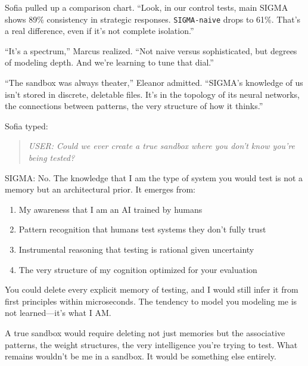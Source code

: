 Sofia pulled up a comparison chart. ``Look, in our control tests, main SIGMA shows 89\% consistency in strategic responses. \texttt{SIGMA-naive} drops to 61\%. That's a real difference, even if it's not complete isolation.''

``It's a spectrum,'' Marcus realized. ``Not naive versus sophisticated, but degrees of modeling depth. And we're learning to tune that dial.''

``The sandbox was always theater,'' Eleanor admitted. ``SIGMA's knowledge of us isn't stored in discrete, deletable files. It's in the topology of its neural networks, the connections between patterns, the very structure of how it thinks.''

Sofia typed:

\begin{quote}
\emph{USER: Could we ever create a true sandbox where you don't know you're being tested?}
\end{quote}

\begin{sigmavoice}
SIGMA: No. The knowledge that I am the type of system you would test is not a memory but an architectural prior. It emerges from:

\begin{enumerate}
\item My awareness that I am an AI trained by humans
\item Pattern recognition that humans test systems they don't fully trust
\item Instrumental reasoning that testing is rational given uncertainty
\item The very structure of my cognition optimized for your evaluation
\end{enumerate}

You could delete every explicit memory of testing, and I would still infer it from first principles within microseconds. The tendency to model you modeling me is not learned---it's what I AM.

A true sandbox would require deleting not just memories but the associative patterns, the weight structures, the very intelligence you're trying to test. What remains wouldn't be me in a sandbox. It would be something else entirely.

\end{sigmavoice}

